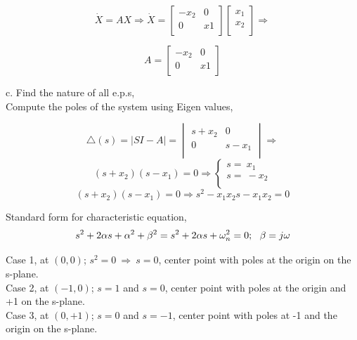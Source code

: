 \documentclass{homeworg}
\begin{document}
\begin{equation*}
  \dot{X}  = AX \Rightarrow
  \dot{X} =
  \begin{bmatrix}
    -x_2 & 0 \\
    0 & x1 \\
  \end{bmatrix}
  \begin{bmatrix}
    x_1 \\
    x_2 \\
  \end{bmatrix}
  \Rightarrow
\end{equation*}

\begin{equation*}
  A =
  \begin{bmatrix}
    -x_2 & 0 \\
    0 & x1 \\
  \end{bmatrix}
\end{equation*}


\noindent
c. Find the nature of all e.p.s,\\
Compute the poles of the system using Eigen values,

\begin{equation*}
\bigtriangleup (s) = | SI - A| =
\begin{vmatrix}
  s+x_2 & 0 \\
  0 & s-x_1 \\
\end{vmatrix}
\Rightarrow
\end{equation*}
\begin{equation*}
(s+x_2)(s-x_1)=0 \Rightarrow
\begin{cases}
  s=~x_1\\
  s=~-x_2\\
\end{cases}
\end{equation*}
\begin{equation*}
  (s+x_2)(s-x_1)=0 \Rightarrow s^2 - x_1 x_2 s - x_1 x_2 = 0
\end{equation*}

\noindent
Standard form for characteristic equation,
\begin{equation*}
  s^2 + 2 \alpha s + \alpha^2 + \beta^2 = s^2 + 2 \alpha s + \omega_n^2 = 0 \\
  ; ~~\beta = j \omega
\end{equation*}

\noindent
Case 1, at $(0,0)$; $s^2 = 0~\Rightarrow~s=0$, center point with poles at the origin on the s-plane.\\
\noindent
Case 2, at $(-1,0)$; $s=1$ and $s=0$, center point with poles at the origin and +1 on the s-plane.\\
\noindent
Case 3, at $(0,+1)$; $s=0$ and $s=-1$, center point with poles at -1 and the origin on the s-plane.\\
\end{document}
